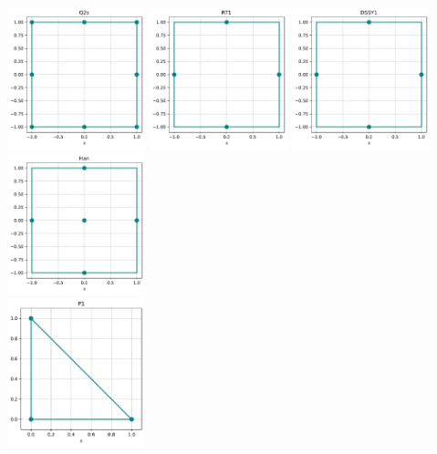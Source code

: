 \begin{center}
\includegraphics[width=4cm]{python_codes/fieldstone_120/spaces/Q2s_nodes}
\includegraphics[width=4cm]{python_codes/fieldstone_120/spaces/RT1_nodes}
\includegraphics[width=4cm]{python_codes/fieldstone_120/spaces/DSSY1_nodes}\\
\includegraphics[width=4cm]{python_codes/fieldstone_120/spaces/Han_nodes}\\
\includegraphics[width=4cm]{python_codes/fieldstone_120/spaces/P1_nodes}

\end{center}
